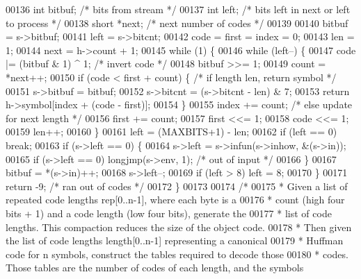 \begin{DoxyCode}
00136     \textcolor{keywordtype}{int} bitbuf;         \textcolor{comment}{/* bits from stream */}
00137     \textcolor{keywordtype}{int} left;           \textcolor{comment}{/* bits left in next or left to process */}
00138     \textcolor{keywordtype}{short} *next;        \textcolor{comment}{/* next number of codes */}
00139 
00140     bitbuf = s->bitbuf;
00141     left = s->bitcnt;
00142     code = first = index = 0;
00143     len = 1;
00144     next = h->count + 1;
00145     \textcolor{keywordflow}{while} (1) \{
00146         \textcolor{keywordflow}{while} (left--) \{
00147             code |= (bitbuf & 1) ^ 1;   \textcolor{comment}{/* invert code */}
00148             bitbuf >>= 1;
00149             count = *next++;
00150             \textcolor{keywordflow}{if} (code < first + count) \{ \textcolor{comment}{/* if length len, return symbol */}
00151                 s->bitbuf = bitbuf;
00152                 s->bitcnt = (s->bitcnt - len) & 7;
00153                 \textcolor{keywordflow}{return} h->symbol[index + (code - first)];
00154             \}
00155             index += count;             \textcolor{comment}{/* else update for next length */}
00156             first += count;
00157             first <<= 1;
00158             code <<= 1;
00159             len++;
00160         \}
00161         left = (MAXBITS+1) - len;
00162         \textcolor{keywordflow}{if} (left == 0) \textcolor{keywordflow}{break};
00163         \textcolor{keywordflow}{if} (s->left == 0) \{
00164             s->left = s->infun(s->inhow, &(s->in));
00165             \textcolor{keywordflow}{if} (s->left == 0) longjmp(s->env, 1);       \textcolor{comment}{/* out of input */}
00166         \}
00167         bitbuf = *(s->in)++;
00168         s->left--;
00169         \textcolor{keywordflow}{if} (left > 8) left = 8;
00170     \}
00171     \textcolor{keywordflow}{return} -9;                          \textcolor{comment}{/* ran out of codes */}
00172 \}
00173 
00174 \textcolor{comment}{/*}
00175 \textcolor{comment}{ * Given a list of repeated code lengths rep[0..n-1], where each byte is a}
00176 \textcolor{comment}{ * count (high four bits + 1) and a code length (low four bits), generate the}
00177 \textcolor{comment}{ * list of code lengths.  This compaction reduces the size of the object code.}
00178 \textcolor{comment}{ * Then given the list of code lengths length[0..n-1] representing a canonical}
00179 \textcolor{comment}{ * Huffman code for n symbols, construct the tables required to decode those}
00180 \textcolor{comment}{ * codes.  Those tables are the number of codes of each length, and the symbols}

\end{DoxyCode}
